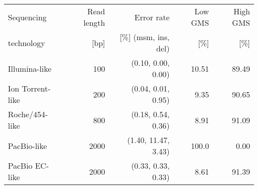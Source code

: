     \begin{tabular}{lrrrr}
    \toprule
    Sequencing                 & Read length   & Error rate & Low GMS          & High GMS \\
    technology                 & [bp]          & [\%] (msm, ins, del) & [\%]             & [\%] \\
    \midrule
    Illumina-like              & 100           & (0.10, 0.00, 0.00) & 10.51            & 89.49      \\
    Ion Torrent-like           & 200           & (0.04, 0.01, 0.95) & 9.35  & 90.65      \\
    Roche/454-like             & 800           & (0.18, 0.54, 0.36) & 8.91  & 91.09      \\
	PacBio-like                & 2000          & (1.40, 11.47, 3.43) & 100.0            & 0.00      \\
	PacBio EC-like             & 2000          & (0.33, 0.33, 0.33) & 8.61  & 91.39      \\
    \bottomrule
    \end{tabular}